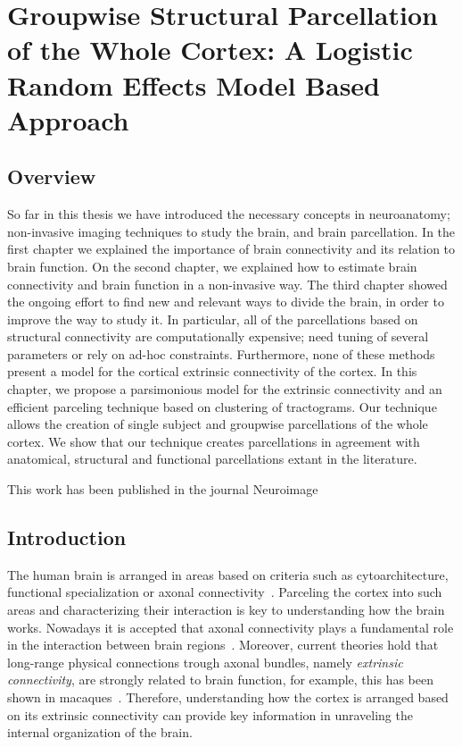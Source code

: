\chapter{Groupwise Structural Parcellation of the Whole Cortex: A Logistic Random Effects Model Based Approach}
%
%
\section{Overview}
So far in this thesis we have introduced the necessary concepts in neuroanatomy;
non-invasive imaging techniques to study the brain, and brain parcellation. In
the first chapter we explained the importance of brain connectivity and its
relation to brain function. On the second chapter, we explained how to estimate
brain connectivity and brain function in a non-invasive way. The third chapter
showed the ongoing effort to find new and relevant ways to divide the brain,
in order to improve the way to study it. In particular, all of the parcellations
based on structural connectivity are computationally expensive; need tuning of
several parameters or rely on ad-hoc constraints. Furthermore, none of these 
methods present a model for the cortical extrinsic connectivity of the cortex.
In this chapter, we propose a parsimonious model for the extrinsic connectivity
and an efficient parceling technique based on clustering of tractograms. 
Our technique allows the creation of single subject and groupwise parcellations
of the whole cortex. We show that our technique creates parcellations in
agreement with anatomical, structural and functional parcellations extant in 
the literature.

This work has been published in the journal Neuroimage \cite{Gallardo2017}
%
\section{Introduction}
%
The human brain is arranged in areas based on criteria such as cytoarchitecture,
functional specialization or axonal connectivity~\citep{Brodmann1909, Thirion2014,
ThiebautdeSchotten2016}. Parceling the cortex into such areas and 
characterizing their interaction is key to understanding how the brain works.
Nowadays it is accepted that axonal connectivity plays a fundamental role in the
interaction between brain regions~\citep{Schmahmann2006}. Moreover, current theories
hold that long-range physical connections trough axonal bundles,
namely \textit{extrinsic connectivity}, are strongly related to brain function, for example,
this has been shown in macaques~\citep{Passingham2002}. Therefore, understanding
how the cortex is arranged based on its extrinsic connectivity can
provide key information in unraveling the internal organization of the brain.

